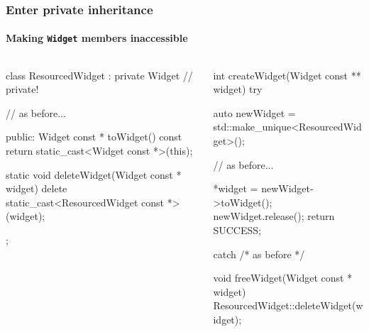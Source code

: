 \documentclass{beamer}
\def\code#1{\texttt{#1}}
\begin{document}

\begin{frame}[fragile]
\frametitle{Enter private inheritance}
\framesubtitle{Making \code{Widget} members inaccessible}
\pause
\begin{columns}
\begin{column}{0.45\textwidth}
\begin{TinyC++}
class ResourcedWidget : private Widget // private!
{
	// as before...

public:	
	Widget const * toWidget() const
	{
		return static_cast<Widget const *>(this);
	}
	
	static void deleteWidget(Widget const * widget)
	{
		delete static_cast<ResourcedWidget const *>(widget);
	}
};
\end{TinyC++}
\end{column}
\pause
\begin{column}{0.45\textwidth}
\begin{TinyC++}
int createWidget(Widget const ** widget)
try
{
	auto newWidget = std::make_unique<ResourcedWidget>();
	
	// as before...
    
	*widget = newWidget->toWidget();
	newWidget.release();
	return SUCCESS;
}
catch /* as before */
\end{TinyC++}

\begin{TinyC++}
void freeWidget(Widget const * widget)
{
	ResourcedWidget::deleteWidget(widget);
}
\end{TinyC++}
\end{column}
\end{columns}
\end{frame}

\end{document}
